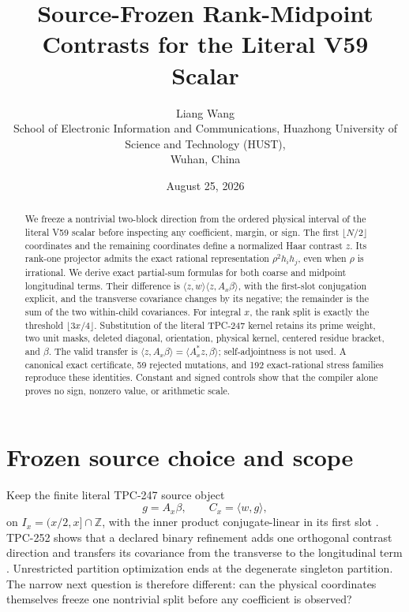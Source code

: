 \documentclass[10pt]{article}
\title{Source-Frozen Rank-Midpoint Contrasts for the Literal V59 Scalar}
\author{Liang Wang\\
\small School of Electronic Information and Communications, Huazhong University of Science and Technology (HUST),\\
\small Wuhan, China}
\date{August 25, 2026}
\newcommand{\Z}{\mathbb Z}
\newcommand{\ip}[2]{\langle #1,#2\rangle}
\newcommand{\conj}[1]{\overline{#1}}
\begin{document}
\maketitle

\begin{abstract}
We freeze a nontrivial two-block direction from the ordered physical interval
of the literal V59 scalar before inspecting any coefficient, margin, or sign.
The first $\lfloor N/2\rfloor$ coordinates and the remaining coordinates
define a normalized Haar contrast $z$.  Its rank-one projector admits the
exact rational representation $\rho^2h_i h_j$, even when $\rho$ is
irrational.  We derive exact partial-sum formulas for both coarse and midpoint
longitudinal terms.  Their difference is
$\conj{\ip zw}\ip z{A_x\beta}$, with the first-slot conjugation explicit,
and the transverse covariance changes by its negative; the remainder is the
sum of the two within-child covariances.  For integral $x$, the rank split is
exactly the threshold $\lfloor3x/4\rfloor$.  Substitution of the literal
TPC-247 kernel retains its prime weight, two unit masks, deleted diagonal,
orientation, physical kernel, centered residue bracket, and $\beta$.  The
valid transfer is $\ip z{A_x\beta}=\ip{A_x^*z}\beta$; self-adjointness is not
used.  A canonical exact certificate, 59 rejected mutations, and 192
exact-rational stress families reproduce these identities.  Constant and
signed controls show that the compiler alone proves no sign, nonzero value,
or arithmetic scale.
\end{abstract}

\section{Frozen source choice and scope}

Keep the finite literal TPC-247 source object
\begin{equation}
 g=A_x\beta,\qquad C_x=\ip wg,                         \label{eq:source}
\end{equation}
on $I_x=(x/2,x]\cap\Z$, with the inner product conjugate-linear in its
first slot \cite{tpc247}.  TPC-252 shows that a declared binary refinement
adds one orthogonal contrast direction and transfers its covariance from the
transverse to the longitudinal term \cite{tpc252}.  Unrestricted partition
optimization ends at the degenerate singleton partition.  The narrow next
question is therefore different: can the physical coordinates themselves
freeze one nontrivial split before any coefficient is observed?
\end{document}
